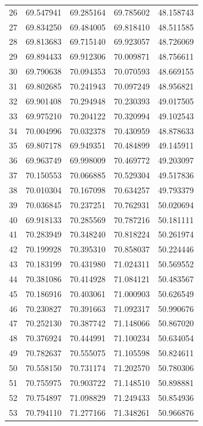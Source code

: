 \begin{table}
\begin{tabular}{rrrrr}
26 & 69.547941 & 69.285164 & 69.785602 & 48.158743 \\
27 & 69.834250 & 69.484005 & 69.818410 & 48.511585 \\
28 & 69.813683 & 69.715140 & 69.923057 & 48.726069 \\
29 & 69.894433 & 69.912306 & 70.009871 & 48.756611 \\
30 & 69.790638 & 70.094353 & 70.070593 & 48.669155 \\
31 & 69.802685 & 70.241943 & 70.097249 & 48.956821 \\
32 & 69.901408 & 70.294948 & 70.230393 & 49.017505 \\
33 & 69.975210 & 70.204122 & 70.320994 & 49.102543 \\
34 & 70.004996 & 70.032378 & 70.430959 & 48.878633 \\
35 & 69.807178 & 69.949351 & 70.484899 & 49.145911 \\
36 & 69.963749 & 69.998009 & 70.469772 & 49.203097 \\
37 & 70.150553 & 70.066885 & 70.529304 & 49.517836 \\
38 & 70.010304 & 70.167098 & 70.634257 & 49.793379 \\
39 & 70.036845 & 70.237251 & 70.762931 & 50.020694 \\
40 & 69.918133 & 70.285569 & 70.787216 & 50.181111 \\
41 & 70.283949 & 70.348240 & 70.818224 & 50.261974 \\
42 & 70.199928 & 70.395310 & 70.858037 & 50.224446 \\
43 & 70.183199 & 70.431980 & 71.024311 & 50.569552 \\
44 & 70.381086 & 70.414928 & 71.084121 & 50.483567 \\
45 & 70.186916 & 70.403061 & 71.000903 & 50.626549 \\
46 & 70.230827 & 70.391663 & 71.092317 & 50.990676 \\
47 & 70.252130 & 70.387742 & 71.148066 & 50.867020 \\
48 & 70.376924 & 70.444991 & 71.100234 & 50.634054 \\
49 & 70.782637 & 70.555075 & 71.105598 & 50.824611 \\
50 & 70.558150 & 70.731174 & 71.202570 & 50.780306 \\
51 & 70.755975 & 70.903722 & 71.148510 & 50.898881 \\
52 & 70.754897 & 71.098829 & 71.249433 & 50.854936 \\
53 & 70.794110 & 71.277166 & 71.348261 & 50.966876 \\

\end{tabular}
\end{table}
